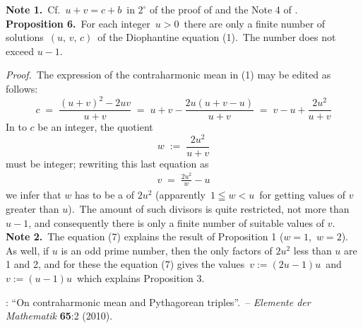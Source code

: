 \documentclass[12pt]{article}
\theoremstyle{definition}
\begin{document}
\textbf{Note 1.}\, Cf.\, $u\!+\!v = c\!+\!b$\, in $2^\circ$ of 
the proof of 
and the Note 4 of .\\

\textbf{Proposition 6.}\, For each integer \,$u > 0$\, there are only a finite number of solutions\, $(u,\,v,\,c)$\, of the Diophantine equation (1).\, The number does not exceed $u\!-\!1$.

\emph{Proof.}\, The expression of the contraharmonic mean in (1) may be edited as follows:
$$c \;=\; \frac{(u\!+\!v)^2-2uv}{u\!+\!v} \;=\; u\!+\!v-\frac{2u(u\!+\!v\!-\!u)}{u\!+\!v} 
\;=\; v\!-\!u+\frac{2u^2}{u\!+\!v}$$
In  to $c$ be an integer, the quotient
$$w \;:=\; \frac{2u^2}{u\!+\!v}$$
must be integer; rewriting this last equation as
\begin{align}
v \;=\; \frac{2u^2}{w}\!-\!u
\end{align}
we infer that $w$ has to be a  of $2u^2$ (apparently\, $1 \leqq w < u$\, for getting values of 
$v$ greater than $u$).\, The amount of such divisors is quite restricted, not more than $u\!-\!1$, and consequently there is only a finite number of suitable values of $v$.\\

\textbf{Note 2.}\, The equation (7) explains the result of Proposition 1 ($w = 1$,\, $w = 2$).\, As well, if $u$ is an odd prime number, then the only factors of $2u^2$ less than $u$ are 1 and 2, and for these the equation (7) gives the values\, $v := (2u\!-\!1)u$\, and\, $v := (u\!-\!1)u$\, which explains Proposition 3.

\begin{thebibliography}{8}
: ``On contraharmonic mean and Pythagorean triples''.\, -- \emph{Elemente der Mathematik} \textbf{65}:2 (2010).
\end{thebibliography}

\end{document}
